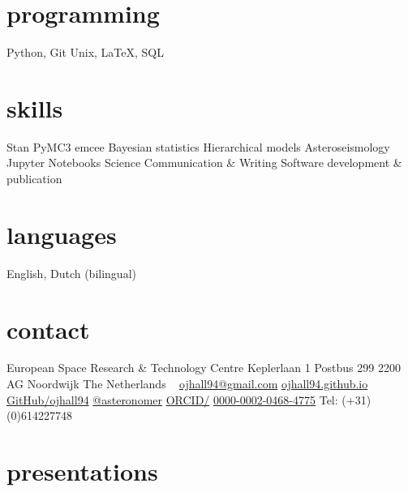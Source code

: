 \documentclass[letterpaper]{k-cv} %
\begin{document}


\begin{aside} %
\section{\color{c1}programming}
\bodyfont Python, Git
Unix, LaTeX,
SQL
\section{\color{c2}skills}
Stan
PyMC3
emcee 
Bayesian statistics
Hierarchical models
Asteroseismology
Jupyter Notebooks
Science Communication \& Writing
Software development \& publication
\section{\color{c3}languages}
English, Dutch (bilingual)
\section{\color{c4}contact}
European Space Research \& Technology Centre
Keplerlaan 1
Postbus 299
2200 AG Noordwijk
The Netherlands
~
\href{mailto:ojhall94@gmail.com}{ojhall94@gmail.com}
\href{http://www.ojhall94.github.io}{ojhall94.github.io}
\href{http://www.github.com/ojhall94}{GitHub/ojhall94}
\href{http://www.twitter.com/asteronomer}{@asteronomer}
\href{http://www.orcid.com/0000-0002-0468-4775}{ORCID/}
\href{http://www.orcid.com/0000-0002-0468-4775}{0000-0002-0468-4775}
Tel: (+31)(0)614227748
\end{aside}

\section{\color{c1}presentations}
\end{document}
